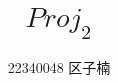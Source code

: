 \documentclass[a4paper]{article}                         %
\title{$Proj_{2}$}       %
\date{}                                         %
\author{22340048 \quad 区子楠}
\begin{document}



\maketitle
\center
\tableofcontents
\center

\newpage

\newpage

\newpage

\newpage

\newpage


\newpage
\end{document}
